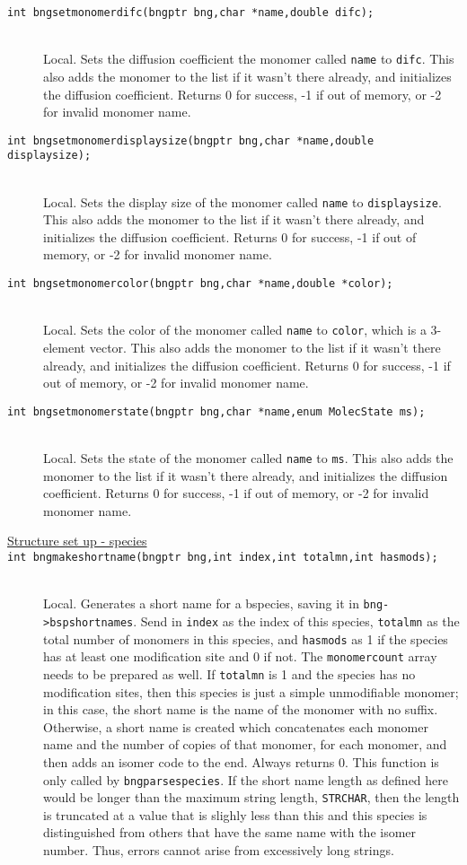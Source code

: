 \documentclass {scrbook}
\newcommand {\ttt} {\texttt}
\begin{document}
\begin{description}
\item[\ttt{int bngsetmonomerdifc(bngptr bng,char *name,double difc);}]
\hfill \\
Local. Sets the diffusion coefficient the monomer called \ttt{name} to \ttt{difc}. This also adds the monomer to the list if it wasn't there already, and initializes the diffusion coefficient. Returns 0 for success, -1 if out of memory, or -2 for invalid monomer name.

\item[\ttt{int bngsetmonomerdisplaysize(bngptr bng,char *name,double displaysize);}]
\hfill \\
Local. Sets the display size of the monomer called \ttt{name} to \ttt{displaysize}. This also adds the monomer to the list if it wasn't there already, and initializes the diffusion coefficient. Returns 0 for success, -1 if out of memory, or -2 for invalid monomer name.

\item[\ttt{int bngsetmonomercolor(bngptr bng,char *name,double *color);}]
\hfill \\
Local. Sets the color of the monomer called \ttt{name} to \ttt{color}, which is a 3-element vector. This also adds the monomer to the list if it wasn't there already, and initializes the diffusion coefficient. Returns 0 for success, -1 if out of memory, or -2 for invalid monomer name.

\item[\ttt{int bngsetmonomerstate(bngptr bng,char *name,enum MolecState ms);}]
\hfill \\
Local. Sets the state of the monomer called \ttt{name} to \ttt{ms}. This also adds the monomer to the list if it wasn't there already, and initializes the diffusion coefficient. Returns 0 for success, -1 if out of memory, or -2 for invalid monomer name.

\item[\underline{Structure set up - species}]

\item[\ttt{int bngmakeshortname(bngptr bng,int index,int totalmn,int hasmods);}]
\hfill \\
Local. Generates a short name for a bspecies, saving it in \ttt{bng->bspshortnames}. Send in \ttt{index} as the index of this species, \ttt{totalmn} as the total number of monomers in this species, and \ttt{hasmods} as 1 if the species has at least one modification site and 0 if not. The \ttt{monomercount} array needs to be prepared as well. If \ttt{totalmn} is 1 and the species has no modification sites, then this species is just a simple unmodifiable monomer; in this case, the short name is the name of the monomer with no suffix. Otherwise, a short name is created which concatenates each monomer name and the number of copies of that monomer, for each monomer, and then adds an isomer code to the end. Always returns 0. This function is only called by \ttt{bngparsespecies}. If the short name length as defined here would be longer than the maximum string length, \ttt{STRCHAR}, then the length is truncated at a value that is slighly less than this and this species is distinguished from others that have the same name with the isomer number. Thus, errors cannot arise from excessively long strings.


\end{description}
\end{document}

